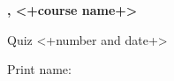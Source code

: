 
\begin{minipage}{.3\textwidth}
  \centerline{\bf <+course number+>, <+course name+>}
  \medskip
  \centerline{Quiz <+number and date+>}
\end{minipage}%
\begin{minipage}{.7\textwidth}
  \hfill\large {} \hfill \else Print name:\enspace\hrulefill \fi
\end{minipage}

  \medskip

